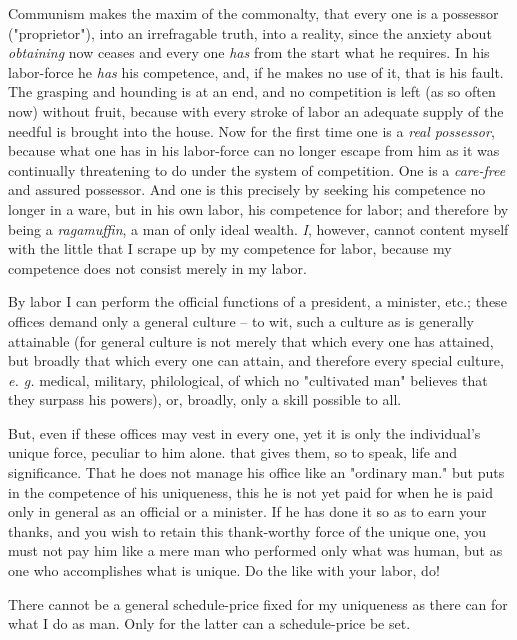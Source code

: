 \documentclass[a4paper]{book}
\begin{document}
Communism makes the maxim of the commonalty, that every one is a possessor 
("{}proprietor"{}), into an irrefragable truth, into a reality, since the 
anxiety about \textit{obtaining} now ceases and every one \textit{has} from 
the start what he requires. In his labor-force he \textit{has} his competence, 
and, if he makes no use of it, that is his fault. The grasping and hounding is 
at an end, and no competition is left (as so often now) without fruit, because 
with every stroke of labor an adequate supply of the needful is brought into 
the house. Now for the first time one is a \textit{real possessor}, because 
what one has in his labor-force can no longer escape from him as it was 
continually threatening to do under the system of competition. One is a 
\textit{care-free} and assured possessor. And one is this precisely by seeking 
his competence no longer in a ware, but in his own labor, his competence for 
labor; and therefore by being a \textit{ragamuffin}, a man of only ideal 
wealth. \textit{I}, however, cannot content myself with the little that I 
scrape up by my competence for labor, because my competence does not consist 
merely in my labor.

By labor I can perform the official functions of a president, a minister, 
etc.; these offices demand only a general culture -- to wit, such a culture as 
is generally attainable (for general culture is not merely that which every 
one has attained, but broadly that which every one can attain, and therefore 
every special culture, \textit{e. g.} medical, military, philological, of 
which no "{}cultivated man"{} believes that they surpass his powers), or, 
broadly, only a skill possible to all.

But, even if these offices may vest in every one, yet it is only the 
individual's unique force, peculiar to him alone. that gives them, so to 
speak, life and significance. That he does not manage his office like an 
"{}ordinary man."{} but puts in the competence of his uniqueness, this he is 
not yet paid for when he is paid only in general as an official or a minister. 
If he has done it so as to earn your thanks, and you wish to retain this 
thank-worthy force of the unique one, you must not pay him like a mere man who 
performed only what was human, but as one who accomplishes what is unique. Do 
the like with your labor, do!

There cannot be a general schedule-price fixed for my uniqueness as there can 
for what I do as man. Only for the latter can a schedule-price be set.
\end{document}

